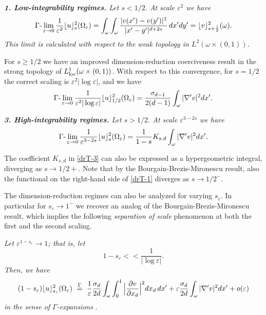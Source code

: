 \documentclass[11pt]{article}
\def\e{\varepsilon}
\begin{document}
\smallskip
{}

\smallskip
{\em 
{\bf 1. Low-integrability regimes.} Let $s<1/2$. At scale $\e^2$ we have
 \begin{equation}\label{drT-1}
    \Gamma\hbox{-}\lim_{\e\to 0} \frac{1}{\e^{2}}\lfloor u\rfloor^2_{s}(\Omega_\e)=\int_\omega\int_\omega 
\frac{|v(x')-v(y')|^2}{|x'-y'|^{d+2s}}\, dx^\prime  dy^\prime=\lfloor v\rfloor^2_{s+\frac12}(\omega).
  \end{equation}
  This limit is calculated with respect to the weak topology in $L^2(\omega\times(0,1))$.
  
 For $s\ge1/2$  we have an improved dimension-reduction coerciveness result in the strong topology of $L^1_{\rm loc}(\omega\times(0,1))$. With respect to this convergence, for $s=1/2$ the correct scaling is $\e^2|\log\e|$, and we have
\begin{equation}\label{drT-2}
    \Gamma\hbox{-}\lim_{\e\to 0} \frac{1}{\e^{2}|\log\e|}\lfloor u\rfloor^2_{1/2}(\Omega_\e)=\frac{\sigma_{d-1}}{2(d-1)}\int_\omega
|\nabla' v|^2dx'.
  \end{equation}
}

\smallskip
{\em 
{\bf 3. High-integrability regimes.} Let $s>1/2$. At scale $\e^{3-2s}$
we have
\begin{equation}\label{drT-3}
    \Gamma\hbox{-}\lim_{\e\to 0} \frac{1}{\e^{3-2s}}\lfloor u\rfloor^2_{s}(\Omega_\e)=\frac{1}{1-s} K_{s,d}\int_{\omega} |\nabla' v|^2 dx'.
  \end{equation} }
  
   The coefficient $K_{s,d}$
in \eqref{drT-3} can also be expressed as a hypergeometric integral, diverging as $s\to1/2+$. Note that by the Bourgain-Brezis-Mironescu result, also the functional on the right-hand side of \eqref{drT-1} diverges as $s\to1/2^-$. 


\smallskip
The dimension-reduction regimes can also be analyzed for varying $s_\e$. In particular for $s_\e\to 1^-$ we recover an analog of the Bourgain-Brezis-Mironescu result, which implies the following {\em separation of scale} phenomenon at both the first and the second scaling.

\medskip
{}
{\em
Let $\e^{1-s_\e}\to 1$; that is, let
$$
1-s_\e<\!<\frac1{|\log\e|}.
$$
Then, we have
$$
(1-s_\e)\lfloor u\rfloor^2_{s_\e}(\Omega_\e)\ \buildrel\Gamma\over =\ \frac1\e\frac{
\sigma_{d}}{2d}\int_{\omega}\int_0^1\Big|\frac{\partial v}{\partial x_d}\Big|^2 dx_d\, dx^\prime
+\e\frac{\sigma_{d}}{2d}\int_{\omega} |\nabla' v|^2 dx'
+o(\e)
$$
in the sense of $\Gamma$-expansions} \cite{BT}.
\end{document}
